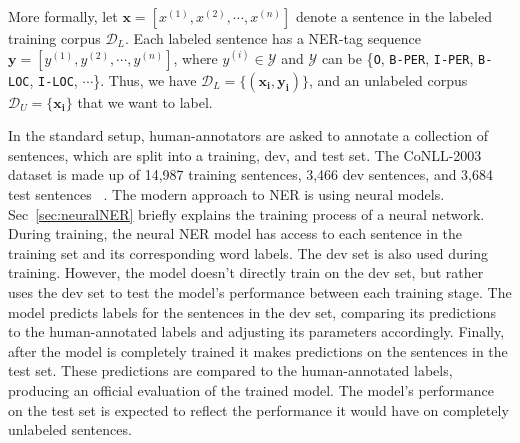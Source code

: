 More formally, let $\mathbf{x}=[x^{(1)}, x^{(2)}, \cdots, x^{(n)}]$ denote a sentence in the labeled training corpus $\mathcal{D}_{L}$.
Each labeled sentence has a NER-tag sequence $\textbf{y}=[y^{(1)}, y^{(2)}, \cdots, y^{(n)}]$, where $y^{(i)}\in \mathcal{Y}$ and  $\mathcal{Y}$ can be \{\texttt{O}, \texttt{B-PER}, \texttt{I-PER}, \texttt{B-LOC}, \texttt{I-LOC}, $\cdots$\}.
Thus, we have $\mathcal{D}_{L}=\{(\mathbf{x_i}, \mathbf{y_i})\}$, and an unlabeled corpus $\mathcal{D}_{U}=\{\mathbf{x_i}\}$ that we want to label.

In the standard setup, human-annotators are asked to annotate a collection of sentences, which are split into a training, dev, and test set. The CoNLL-2003 dataset is made up of 14,987 training sentences, 3,466 dev sentences, and 3,684 test sentences ~\citep{conll}. The modern approach to NER is using neural models. Sec~\ref{sec:neuralNER} briefly explains the training process of a neural network. During training, the neural NER model has access to each sentence in the training set and its corresponding word labels. The dev set is also used during training. However, the model doesn't directly train on the dev set, but rather uses the dev set to test the model's performance between each training stage. The model predicts labels for the sentences in the dev set, comparing its predictions to the human-annotated labels and adjusting its parameters accordingly. Finally, after the model is completely trained it makes predictions on the sentences in the test set. These predictions are compared to the human-annotated labels, producing an official evaluation of the trained model. The model's performance on the test set is expected to reflect the performance it would have on completely unlabeled sentences.


